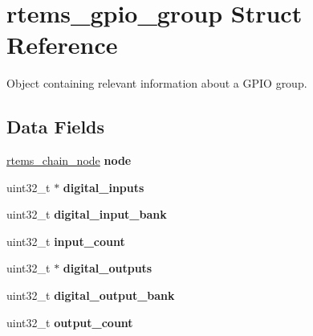 \hypertarget{structrtems__gpio__group}{}\section{rtems\+\_\+gpio\+\_\+group Struct Reference}
\label{structrtems__gpio__group}


Object containing relevant information about a G\+P\+IO group.  


\subsection*{Data Fields}
\begin{DoxyCompactItemize}
\item 
\mbox{\label{structrtems__gpio__group_ac24a52b5a72c9defa31556a5a4800405}} 
\mbox{\hyperlink{structChain__Node__struct}{rtems\+\_\+chain\+\_\+node}} {\bfseries node}
\item 
\mbox{\label{structrtems__gpio__group_ab1873fe770580574fd55ee6ea2723d31}} 
uint32\+\_\+t $\ast$ {\bfseries digital\+\_\+inputs}
\item 
\mbox{\label{structrtems__gpio__group_af2f8972f161f0ffbcf05e8783c8ede03}} 
uint32\+\_\+t {\bfseries digital\+\_\+input\+\_\+bank}
\item 
\mbox{\label{structrtems__gpio__group_a228b61b1a9de6fbad97fc2ec159103b3}} 
uint32\+\_\+t {\bfseries input\+\_\+count}
\item 
\mbox{\label{structrtems__gpio__group_ad4f64c7b62c91634ca80e2f756a67316}} 
uint32\+\_\+t $\ast$ {\bfseries digital\+\_\+outputs}
\item 
\mbox{\label{structrtems__gpio__group_ad9fbef31d0818786a54eaeaeb6212e85}} 
uint32\+\_\+t {\bfseries digital\+\_\+output\+\_\+bank}
\item 
\mbox{\label{structrtems__gpio__group_a9896b78e16713e76af176d413c2e8f48}} 
uint32\+\_\+t {\bfseries output\+\_\+count}
\item 
\mbox{\label{structrtems__gpio__group_a3a72d395f645858e3d11905a40028b0f}} 

\end{DoxyCompactItemize}
